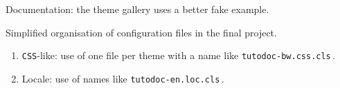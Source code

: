 \documentclass{tutodoc}
\begin{document}
\begin{tdocupdate}
	\item Documentation: the theme gallery uses a better fake example.
\end{tdocupdate}



\begin{tdoctech}
	\item Simplified organisation of configuration files in the final project.
	\begin{enumerate}
		\item \texttt{CSS}-like: use of one file per theme with a name like \texttt{tutodoc-bw.css.cls}\,.

		\item Locale: use of names like \texttt{tutodoc-en.loc.cls}\,.
	\end{enumerate}
\end{tdoctech}
\end{document}
